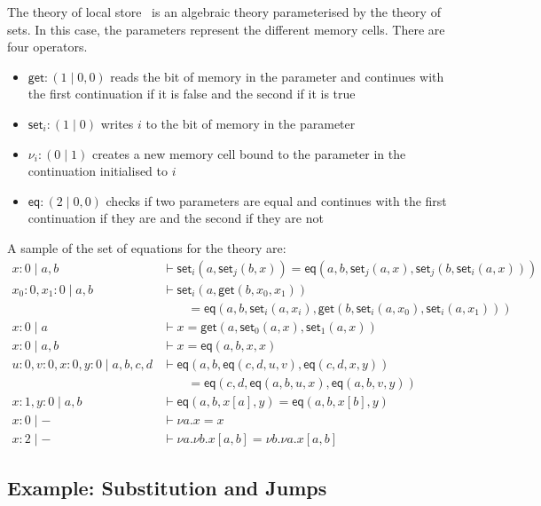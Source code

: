 \documentclass{scrartcl}
\theoremstyle{definition}
\begin{document}
\newcommand{\get}{\mathsf{get}}
\newcommand{\set}[1]{\mathsf{set}_{#1}}
\newcommand{\eq}{\mathsf{eq}}

The theory of local store~\cite{staton_instances_2013} is an algebraic theory parameterised by the theory of sets. In this case, the parameters represent the different memory cells. There are four operators.
\begin{itemize}
    \item $\get : (1\mid 0, 0)$ reads the bit of memory in the parameter and continues with the first continuation if it is false and the second if it is true
    \item $\set{i} : (1 \mid 0)$ writes $i$ to the bit of memory in the parameter
    \item $\nu_i : (0 \mid 1)$ creates a new memory cell bound to the parameter in the continuation initialised to $i$
    \item $\eq : (2\mid 0, 0)$ checks if two parameters are equal and continues with the first continuation if they are and the second if they are not
\end{itemize}

A sample of the set of equations for the theory are:
\begin{align*}
    x: 0 \mid a, b &\vdash \set i(a,\set j(b, x)) = \eq(a,b, \set j(a, x), \set j(b, \set i(a,x))) \\
    x_0:0,x_1:0\mid a,b &\vdash \set i(a, \get(b, x_0,x_1)) \\
    &\qquad = \eq(a,b, \set i(a, x_i), \get(b , \set i(a, x_0), \set i(a, x_1))) \\
    x:0 \mid a &\vdash x = \get(a, \set 0(a, x), \set 1(a, x)) \\
    x:0 \mid a,b &\vdash x = \eq(a,b, x,x) \\
    u:0,v:0,x:0,y:0\mid a,b,c,d &\vdash \eq(a,b , \eq(c,d , u,v), \eq(c,d , x,y)) \\
    &\qquad = \eq(c,d, \eq(a,b, u,x), \eq(a,b, v,y)) \\
    x:1,y:0 \mid a,b &\vdash \eq(a,b, x[a],y) = \eq(a,b, x[b],y) \\
    x: 0 \mid - &\vdash \nu a.x = x \\
    x: 2 \mid - &\vdash \nu a.\nu b.x[a,b] = \nu b.\nu a.x[a,b]
\end{align*}

\subsection{Example: Substitution and Jumps}
\end{document}
